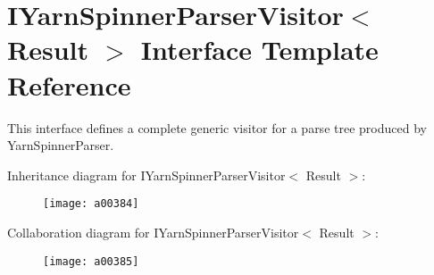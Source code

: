 \hypertarget{a00115}{\section{I\-Yarn\-Spinner\-Parser\-Visitor$<$ Result $>$ Interface Template Reference}
\label{a00115}
}


This interface defines a complete generic visitor for a parse tree produced by Yarn\-Spinner\-Parser.  




Inheritance diagram for I\-Yarn\-Spinner\-Parser\-Visitor$<$ Result $>$\-:
\nopagebreak
\begin{figure}[H]
\begin{center}
\leavevmode
\texttt{[image: a00384]}
\end{center}
\end{figure}


Collaboration diagram for I\-Yarn\-Spinner\-Parser\-Visitor$<$ Result $>$\-:
\nopagebreak
\begin{figure}[H]
\begin{center}
\leavevmode
\texttt{[image: a00385]}
\end{center}
\end{figure}
